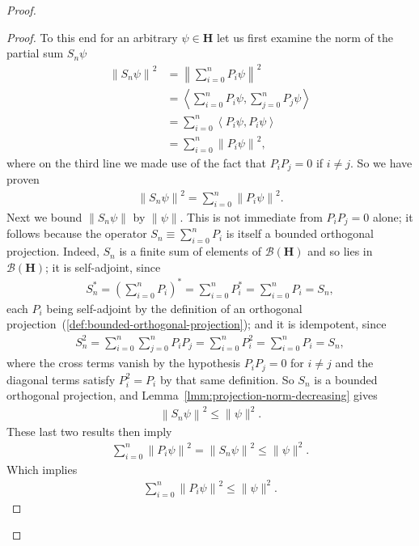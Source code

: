 \begin{proof}
\begin{proof}
To this end for an arbitrary $\psi \in \mathbf{H}$ let us first examine the norm of the partial sum $S_n\psi$
\begin{align}
    \left\| S_n\psi \right\|^2 &= \left\| \sum_{i = 0}^n P_i\psi \right\|^2 \\
                               &= \left< \sum_{i = 0}^n P_i\psi, \sum_{j = 0}^n P_j\psi \right> \\
                               &= \sum_{i = 0}^n \left< P_i\psi, P_i\psi \right> \\
                               &= \sum_{i = 0}^n \left\| P_i\psi \right\|^2,
\end{align}
where on the third line we made use of the fact that $P_iP_j = 0$ if $i \neq j$. So we have proven
\begin{align}
    \left\| S_n\psi \right\|^2 = \sum_{i = 0}^n \left\| P_i\psi \right\|^2.
\end{align}
Next we bound $\left\| S_n\psi \right\|$ by $\left\| \psi \right\|$. This is not immediate from $P_iP_j = 0$ alone; it follows because the operator $S_n \equiv \sum_{i=0}^n P_i$ is itself a bounded orthogonal projection. Indeed, $S_n$ is a finite sum of elements of $\mathcal{B}(\mathbf{H})$ and so lies in $\mathcal{B}(\mathbf{H})$; it is self-adjoint, since
\begin{align}
    S_n^* = \left( \sum_{i=0}^n P_i \right)^* = \sum_{i=0}^n P_i^* = \sum_{i=0}^n P_i = S_n,
\end{align}
each $P_i$ being self-adjoint by the definition of an orthogonal projection~(\ref{def:bounded-orthogonal-projection}); and it is idempotent, since
\begin{align}
    S_n^2 = \sum_{i=0}^n \sum_{j=0}^n P_iP_j = \sum_{i=0}^n P_i^2 = \sum_{i=0}^n P_i = S_n,
\end{align}
where the cross terms vanish by the hypothesis $P_iP_j = 0$ for $i \ne j$ and the diagonal terms satisfy $P_i^2 = P_i$ by that same definition. So $S_n$ is a bounded orthogonal projection, and Lemma~\ref{lmm:projection-norm-decreasing} gives
\begin{align}
    \left\| S_n\psi \right\|^2 \le \|\psi\|^2.
\end{align}
These last two results then imply
\begin{align}
    \sum_{i = 0}^n \left\| P_i\psi \right\|^2 = \left\| S_n\psi \right\|^2 \le \|\psi\|^2.
\end{align}
Which implies
\begin{align}
    \sum_{i = 0}^n \left\| P_i\psi \right\|^2 \le \|\psi\|^2.

\end{align}
\end{proof}
\end{proof}
